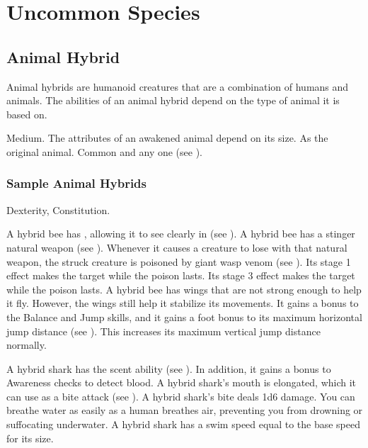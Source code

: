 \chapter{Uncommon Species}\label{Uncommon Species}

\section{Animal Hybrid}
Animal hybrids are humanoid creatures that are a combination of humans and animals.
The abilities of an animal hybrid depend on the type of animal it is based on.

 Medium.
 The attributes of an awakened animal depend on its size.
 As the original animal.
 Common and any one  (see ).

\subsection{Sample Animal Hybrids}


  Dexterity,  Constitution.
\begin{itemize}
	 A hybrid bee has , allowing it to see clearly in  (see ).
	 A hybrid bee has a stinger natural weapon (see ).
	      Whenever it causes a creature to lose  with that natural weapon, the struck creature is poisoned by giant wasp venom (see ).
	      Its stage 1 effect makes the target \slowed while the poison lasts.
	      Its stage 3 effect makes the target \immobilized while the poison lasts.
	 A hybrid bee has wings that are not strong enough to help it fly.
	      However, the wings still help it stabilize its movements.
	      It gains a  bonus to the Balance and Jump skills, and it gains a  foot bonus to its maximum horizontal jump distance (see ).
	      This increases its maximum vertical jump distance normally.
\end{itemize}


\begin{itemize}
	 A hybrid shark has the scent ability (see ).
	      In addition, it gains a  bonus to Awareness checks to detect blood.
	 A hybrid shark's mouth is elongated, which it can use as a bite attack (see ).
	      A hybrid shark's bite deals 1d6 damage.
	 You can breathe water as easily as a human breathes air, preventing you from drowning or suffocating underwater.
	 A hybrid shark has a swim speed equal to the base speed for its size.
\end{itemize}

